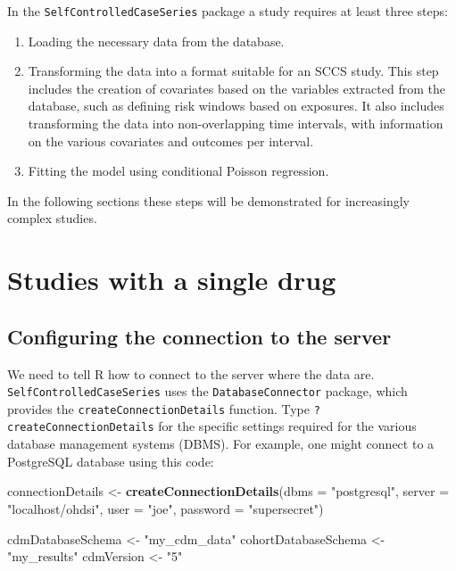 \documentclass[
]{article}
\newenvironment{Shaded}{\begin{snugshade}}{\end{snugshade}}
\newcommand{\DataTypeTok}[1]{\textcolor[rgb]{0.13,0.29,0.53}{#1}}
\newcommand{\KeywordTok}[1]{\textcolor[rgb]{0.13,0.29,0.53}{\textbf{#1}}}
\newcommand{\NormalTok}[1]{#1}
\newcommand{\StringTok}[1]{\textcolor[rgb]{0.31,0.60,0.02}{#1}}
\begin{document}
In the \texttt{SelfControlledCaseSeries} package a study requires at
least three steps:

\begin{enumerate}
\def\labelenumi{\arabic{enumi}.}
\item
  Loading the necessary data from the database.
\item
  Transforming the data into a format suitable for an SCCS study. This
  step includes the creation of covariates based on the variables
  extracted from the database, such as defining risk windows based on
  exposures. It also includes transforming the data into non-overlapping
  time intervals, with information on the various covariates and
  outcomes per interval.
\item
  Fitting the model using conditional Poisson regression.
\end{enumerate}

In the following sections these steps will be demonstrated for
increasingly complex studies.

\hypertarget{studies-with-a-single-drug}{%
\section{Studies with a single drug}\label{studies-with-a-single-drug}}

\hypertarget{configuring-the-connection-to-the-server}{%
\subsection{Configuring the connection to the
server}\label{configuring-the-connection-to-the-server}}

We need to tell R how to connect to the server where the data are.
\texttt{SelfControlledCaseSeries} uses the \texttt{DatabaseConnector}
package, which provides the \texttt{createConnectionDetails} function.
Type \texttt{?createConnectionDetails} for the specific settings
required for the various database management systems (DBMS). For
example, one might connect to a PostgreSQL database using this code:

\begin{Shaded}
\begin{Highlighting}[]
\NormalTok{connectionDetails <-}\StringTok{ }\KeywordTok{createConnectionDetails}\NormalTok{(}\DataTypeTok{dbms =} \StringTok{"postgresql"}\NormalTok{, }
                                             \DataTypeTok{server =} \StringTok{"localhost/ohdsi"}\NormalTok{, }
                                             \DataTypeTok{user =} \StringTok{"joe"}\NormalTok{, }
                                             \DataTypeTok{password =} \StringTok{"supersecret"}\NormalTok{)}

\NormalTok{cdmDatabaseSchema <-}\StringTok{ "my_cdm_data"}
\NormalTok{cohortDatabaseSchema <-}\StringTok{ "my_results"}
\NormalTok{cdmVersion <-}\StringTok{ "5"}
\end{Highlighting}
\end{Shaded}
\end{document}
